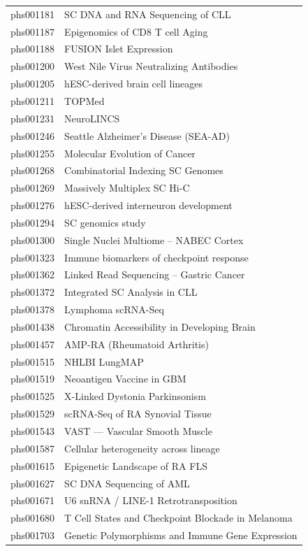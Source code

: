 \documentclass[11pt,letterpaper]{article}
\begin{document}
{\begin{longtable}{@{} l p{10cm} @{}}
phs001181 & SC DNA and RNA Sequencing of CLL \\
phs001187 & Epigenomics of CD8 T cell Aging \\
phs001188 & FUSION Islet Expression \\
phs001200 & West Nile Virus Neutralizing Antibodies \\
phs001205 & hESC-derived brain cell lineages \\
phs001211 & TOPMed \\
phs001231 & NeuroLINCS \\
phs001246 & Seattle Alzheimer's Disease (SEA-AD) \\
phs001255 & Molecular Evolution of Cancer \\
phs001268 & Combinatorial Indexing SC Genomes \\
phs001269 & Massively Multiplex SC Hi-C \\
phs001276 & hESC-derived interneuron development \\
phs001294 & SC genomics study \\
phs001300 & Single Nuclei Multiome -- NABEC Cortex \\
phs001323 & Immune biomarkers of checkpoint response \\
phs001362 & Linked Read Sequencing -- Gastric Cancer \\
phs001372 & Integrated SC Analysis in CLL \\
phs001378 & Lymphoma scRNA-Seq \\
phs001438 & Chromatin Accessibility in Developing Brain \\
phs001457 & AMP-RA (Rheumatoid Arthritis) \\
phs001515 & NHLBI LungMAP \\
phs001519 & Neoantigen Vaccine in GBM \\
phs001525 & X-Linked Dystonia Parkinsonism \\
phs001529 & scRNA-Seq of RA Synovial Tissue \\
phs001543 & VAST --- Vascular Smooth Muscle \\
phs001587 & Cellular heterogeneity across lineage \\
phs001615 & Epigenetic Landscape of RA FLS \\
phs001627 & SC DNA Sequencing of AML \\
phs001671 & U6 snRNA / LINE-1 Retrotransposition \\
phs001680 & T Cell States and Checkpoint Blockade in Melanoma \\
phs001703 & Genetic Polymorphisms and Immune Gene Expression \\

\end{longtable}}
\end{document}
